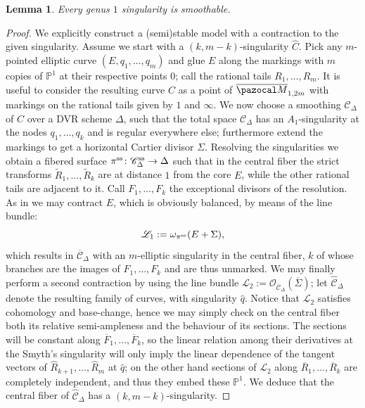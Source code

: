 \documentclass[11pt]{amsart}
\newcommand{\PP}{\mathbb P}
\newcommand{\OO}{\mathcal O}
\renewcommand{\to}{\rightarrow}
\newcommand{\cC}{\mathcal C}
\newcommand{\hC}{\widehat{\mathcal C}}
\newcommand{\oM}{\overline{\pazocal M}}
\newcommand{\dvr}{\Delta}
\theoremstyle{plain}
\newtheorem{lem}[thm]{Lemma}
\theoremstyle{definition}
\begin{document}
\begin{lem}\label{lem:sing_smoothability}
Every genus $1$ singularity is smoothable.
\end{lem}
\begin{proof}
 We explicitly construct a (semi)stable model with a contraction to the given singularity. Assume we start with a $(k,m-k)$-singularity $\widehat C$. Pick any $m$-pointed elliptic curve $(E,q_1,\ldots,q_m)$ and glue $E$ along the markings with $m$ copies of $\PP^1$ at their respective points $0$; call the rational tails $R_1,\ldots,R_m$. It is useful to consider the resulting curve $C$ as a point of $\oM_{1,2m}$ with markings on the rational tails given by $1$ and $\infty$. We now choose a smoothing $\cC_{\dvr}$ of $C$ over a DVR scheme $\dvr$, such that the total space $\cC_{\dvr}$ has an $A_1$-singularity at the nodes $q_1,\ldots,q_k$ and is regular everywhere else; furthermore extend the markings to get a horizontal Cartier divisor $\Sigma$. Resolving the singularities we obtain a fibered surface $\pi^{\rm{ss}}\colon\cC_{\dvr}^{\rm{ss}}\to\dvr$ such that in the central fiber the strict transforms $\widetilde R_1,\ldots,\widetilde R_k$ are at distance $1$ from the core $E$, while the other rational tails are adjacent to it. Call $F_1,\ldots,F_k$ the exceptional divisors of the resolution. As in \cite[Lemma 2.12]{SMY1} we may contract $E$, which is obviously balanced, by means of the line bundle:
 \[\mathcal L_1:=\omega_{\pi^{\rm{ss}}}(E+\Sigma),\]
 which results in $\overline{\cC}_{\dvr}$ with an $m$-elliptic singularity in the central fiber, $k$ of whose branches are the images of $F_1,\ldots,F_k$ and are thus unmarked. We may finally perform a second contraction by using the line bundle $\mathcal L_2:=\OO_{\overline{\cC}_{\dvr}}(\overline{\Sigma})$; let $\hC_{\dvr}$ denote the resulting family of curves, with singularity $\hat q$. Notice that $\mathcal L_2$ satisfies cohomology and base-change, hence we may simply check on the central fiber both its relative semi-ampleness and the behaviour of its sections. The sections will be constant along $\overline F_1,\ldots,\overline F_k$, so the linear relation among their derivatives at the Smyth's singularity will only imply the linear dependence of the tangent vectors of $\widehat R_{k+1},\ldots, \widehat R_m$ at $\hat q$; on the other hand sections of $\mathcal L_2$ along $\overline R_1,\ldots,\overline R_k$ are completely independent, and thus they embed these $\PP^1$. We deduce that the central fiber of $\hC_{\dvr}$ has a $(k,m-k)$-singularity.
\end{proof}
\end{document}
